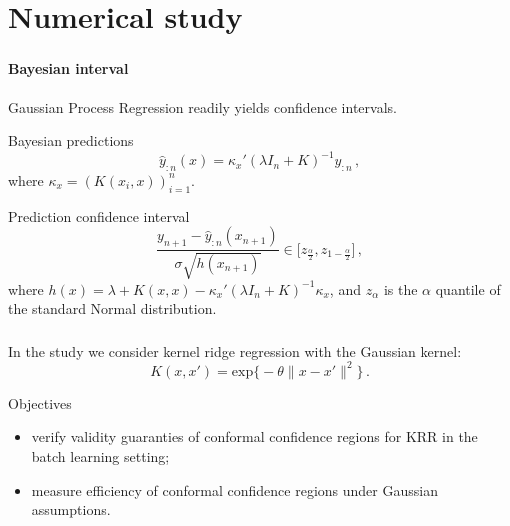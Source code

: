 \documentclass[t]{beamer}  %
\begin{document}


\section{Numerical study} %
\label{sec:Numerical_study}

\begin{frame}[c]\frametitle{\insertsection}
  \framesubtitle{Bayesian interval}
  Gaussian Process Regression readily yields confidence intervals.
  \vspace{\baselineskip}
  \begin{block}{Bayesian predictions}
    $$ \hat{y}_{:n}(x) = \kappa_x' (\lambda I_n + K)^{-1} y_{:n} \,, $$
    where $\kappa_x = (K(x_i, x))_{i=1}^n$.
  \end{block}

  \begin{block}{Prediction confidence interval}
    $$ \frac{y_{n+1} - \hat{y}_{:n}(x_{n+1})}{\sigma \sqrt{h(x_{n+1})}} \in
      \bigl[z_{\frac{\alpha}{2}}, z_{1-\frac{\alpha}{2}} \bigr] \,, $$
    where $ h(x) = \lambda + K(x,x) - \kappa_x' (\lambda I_n + K)^{-1} \kappa_x$,
    and $z_\alpha$ is the $\alpha$ quantile of the standard Normal distribution.
  \end{block}
\end{frame}

\begin{frame}[c]\frametitle{\insertsection}
  In the study we consider kernel ridge regression with the Gaussian kernel:
  $$ K(x,x') = \text{exp}\bigl\{ -\theta \|x-x'\|^2 \bigr\} \,. $$
  \begin{block}{Objectives}
    \begin{itemize}
      \item verify validity guaranties of conformal confidence regions for KRR in
      the batch learning setting;
      \item measure efficiency of conformal confidence regions under Gaussian
      assumptions.
    \end{itemize}
  \end{block}
\end{frame}
\end{document}
